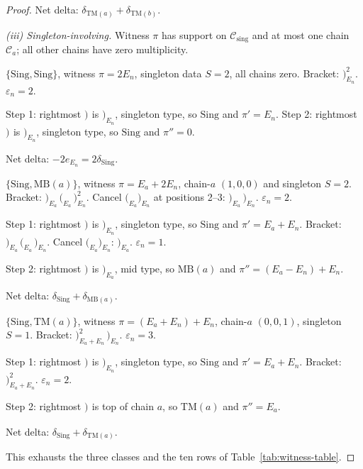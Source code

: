 \documentclass[11pt]{article}
\theoremstyle{definition}
\theoremstyle{remark}
\newcommand{\Sing}{\mathrm{Sing}}
\newcommand{\MB}{\mathrm{MB}}
\newcommand{\TM}{\mathrm{TM}}
\newcommand{\Cmid}{\mathcal{C}}
\newcommand{\Csing}{\mathcal{C}_{\mathrm{sing}}}
\newcommand{\labr}[1]{{)}_{#1}}
\newcommand{\labl}[1]{{(}_{#1}}
\begin{document}
\begin{proof}
Net delta: $\delta_{\TM(a)} + \delta_{\TM(b)}$.

\medskip
\noindent\textit{(iii) Singleton-involving.} Witness $\pi$ has support on $\Csing$
and at most one chain $\Cmid_a$; all other chains have zero multiplicity.

\smallskip
\noindent$\{\Sing, \Sing\}$, witness $\pi = 2 E_n$, singleton data $S = 2$, all chains
zero. Bracket: $\labr{E_n}^{2}$. $\varepsilon_n = 2$.

Step 1: rightmost $\labr{}$ is $\labr{E_n}$, singleton type, so $\Sing$ and
$\pi' = E_n$. Step 2: rightmost $\labr{}$ is $\labr{E_n}$, singleton type, so
$\Sing$ and $\pi'' = 0$.

Net delta: $-2 e_{E_n} = 2 \delta_{\Sing}$.

\smallskip
\noindent$\{\Sing, \MB(a)\}$, witness $\pi = E_a + 2 E_n$, chain-$a$ $(1, 0, 0)$ and
singleton $S = 2$. Bracket: $\labr{E_a}\, \labl{E_a}\, \labr{E_n}^{2}$. Cancel
$\labl{E_a}\labr{E_n}$ at positions 2--3: $\labr{E_a}\, \labr{E_n}$.
$\varepsilon_n = 2$.

Step 1: rightmost $\labr{}$ is $\labr{E_n}$, singleton type, so $\Sing$ and
$\pi' = E_a + E_n$. Bracket: $\labr{E_a}\, \labl{E_a}\, \labr{E_n}$. Cancel
$\labl{E_a}\labr{E_n}$: $\labr{E_a}$. $\varepsilon_n = 1$.

Step 2: rightmost $\labr{}$ is $\labr{E_a}$, mid type, so $\MB(a)$ and
$\pi'' = (E_a - E_n) + E_n$.

Net delta: $\delta_{\Sing} + \delta_{\MB(a)}$.

\smallskip
\noindent$\{\Sing, \TM(a)\}$, witness $\pi = (E_a + E_n) + E_n$, chain-$a$
$(0, 0, 1)$, singleton $S = 1$. Bracket: $\labr{E_a + E_n}^{2}\, \labr{E_n}$.
$\varepsilon_n = 3$.

Step 1: rightmost $\labr{}$ is $\labr{E_n}$, singleton type, so $\Sing$ and
$\pi' = E_a + E_n$. Bracket: $\labr{E_a + E_n}^{2}$. $\varepsilon_n = 2$.

Step 2: rightmost $\labr{}$ is top of chain $a$, so $\TM(a)$ and $\pi'' = E_a$.

Net delta: $\delta_{\Sing} + \delta_{\TM(a)}$.

\medskip
This exhausts the three classes and the ten rows of Table~\ref{tab:witness-table}.
\end{proof}
\end{document}
